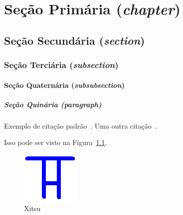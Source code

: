 \documentclass[tcc,capa,table]{textsi}
\begin{document}
\chapter{Seção Primária (\textit{chapter})}

\lipsum[1]

\section{Seção Secundária (\textit{section})}

\lipsum[1-2]

\subsection{Seção Terciária (\textit{subsection})}

\lipsum[1]

\subsubsection{Seção Quaternária (\textit{subsubsection})}

\lipsum[1]

\paragraph{Seção Quinária (\textit{paragraph})}

Exemplo de citação padrão~\cite{barber:92}. Uma outra citação~\cite{silva:18}. \lipsum[1-3]

Isso pode ser visto na Figura~\ref{fig:xitsu}.

\begin{figure}[!h]
\centering
\caption{Xitsu}
\label{fig:xitsu}
\includegraphics[scale=2]{xitsu.png} 
\end{figure}





\makeatletter%
\renewcommand*{\@seccntformat}[1]{\csname the#1\endcsname\hspace{0.2cm}}%
\makeatother%



\end{document}
